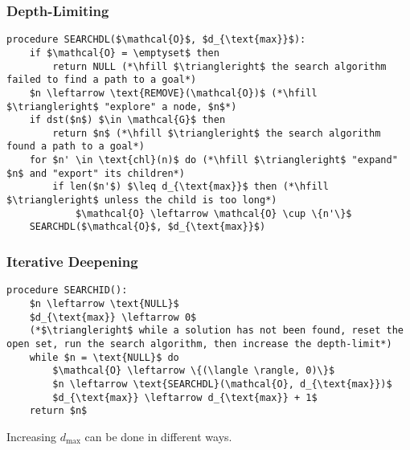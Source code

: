 \subsubsection{Depth-Limiting}
\begin{definition}
\begin{lstlisting}
procedure SEARCHDL($\mathcal{O}$, $d_{\text{max}}$):
    if $\mathcal{O} = \emptyset$ then
        return NULL (*\hfill $\triangleright$ the search algorithm failed to find a path to a goal*)
    $n \leftarrow \text{REMOVE}(\mathcal{O})$ (*\hfill $\triangleright$ "explore" a node, $n$*)
    if dst($n$) $\in \mathcal{G}$ then
        return $n$ (*\hfill $\triangleright$ the search algorithm found a path to a goal*)
    for $n' \in \text{chl}(n)$ do (*\hfill $\triangleright$ "expand" $n$ and "export" its children*)
        if len($n'$) $\leq d_{\text{max}}$ then (*\hfill $\triangleright$ unless the child is too long*)
            $\mathcal{O} \leftarrow \mathcal{O} \cup \{n'\}$
    SEARCHDL($\mathcal{O}$, $d_{\text{max}}$)
\end{lstlisting}

\end{definition}

\subsubsection{Iterative Deepening}
\begin{definition}
\begin{lstlisting}
procedure SEARCHID():
    $n \leftarrow \text{NULL}$
    $d_{\text{max}} \leftarrow 0$
    (*$\triangleright$ while a solution has not been found, reset the open set, run the search algorithm, then increase the depth-limit*)
    while $n = \text{NULL}$ do
        $\mathcal{O} \leftarrow \{(\langle \rangle, 0)\}$
        $n \leftarrow \text{SEARCHDL}(\mathcal{O}, d_{\text{max}})$
        $d_{\text{max}} \leftarrow d_{\text{max}} + 1$
    return $n$
\end{lstlisting}
    
\end{definition}

\begin{warning}
    Increasing $d_{\text{max}}$ can be done in different ways.
\end{warning}


